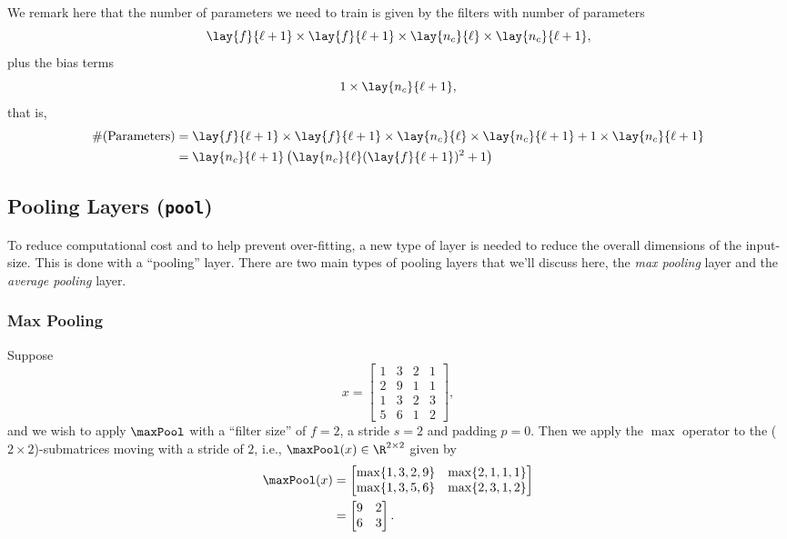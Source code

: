 We remark here that the number of parameters we need to train is given by the filters with number of parameters
$$\lay{f}{\ell+1}\times\lay{f}{\ell+1}\times\lay{n_c}{\ell}\times\lay{n_c}{\ell+1},$$
plus the bias terms
$$1\times\lay{n_c}{\ell+1},$$
that is,
\begin{align*}
	\text{\#(Parameters)}&=\lay{f}{\ell+1}\times\lay{f}{\ell+1}\times\lay{n_c}{\ell}\times\lay{n_c}{\ell+1}+1\times\lay{n_c}{\ell+1}\\
	&=\lay{n_c}{\ell+1}\left(\lay{n_c}{\ell}(\lay{f}{\ell+1})^2+1\right)
\end{align*}



\subsection{Pooling Layers (\texttt{pool})}

To reduce computational cost and to help prevent over-fitting, a new type of layer is needed to reduce the overall dimensions of the input-size.  This is done with a ``pooling'' layer.  There are two main types of pooling layers that we'll discuss here, the \textit{max pooling} layer and the \textit{average pooling} layer.


\subsubsection{Max Pooling}

Suppose
$$x=\begin{bmatrix}
	1&3&2&1\\
	2&9&1&1\\
	1&3&2&3\\
	5&6&1&2
\end{bmatrix},$$
and we wish to apply $\maxPool$ with a ``filter size'' of $f=2$, a stride $s=2$ and padding $p=0$.  Then we apply the $\max$ operator to the ($2\times 2$)-submatrices moving with a stride of $2$, i.e., $\maxPool(x)\in\R^{2\times 2}$ given by
\begin{align*}
	\maxPool(x)&=\begin{bmatrix}
		\max\{1,3,2,9\}&\max\{2,1,1,1\}\\
		\max\{1,3,5,6\}&\max\{2,3,1,2\}
	\end{bmatrix}\\
	&=\begin{bmatrix}
		9&2\\
		6&3
	\end{bmatrix}.
\end{align*}

